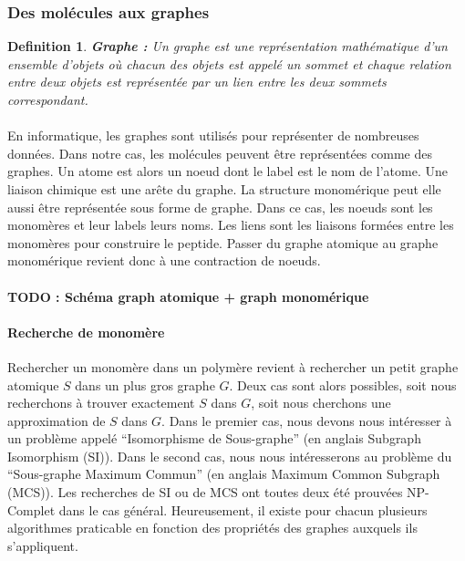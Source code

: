 \documentclass[12pt,french,twoside]{report}
\begin{document}
\subsubsection{Des molécules aux graphes}

\newtheorem{definition}{Definition}
\begin{definition}\textbf{Graphe :}
 Un graphe est une représentation mathématique d'un ensemble d'objets où chacun des objets est appelé un sommet et
 chaque relation entre deux objets est représentée par un lien entre les deux sommets correspondant.
\end{definition}

\paragraph{}En informatique, les graphes sont utilisés pour représenter de nombreuses données.
Dans notre cas, les molécules peuvent être représentées comme des graphes.
Un atome est alors un noeud dont le label est le nom de l'atome.
Une liaison chimique est une arête du graphe.
La structure monomérique peut elle aussi être représentée sous forme de graphe.
Dans ce cas, les noeuds sont les monomères et leur labels leurs noms.
Les liens sont les liaisons formées entre les monomères pour construire le peptide.
Passer du graphe atomique au graphe monomérique revient donc à une contraction de noeuds.

\paragraph{TODO : Schéma graph atomique + graph monomérique}



\paragraph{Recherche de monomère}Rechercher un monomère dans un polymère revient à rechercher un petit graphe atomique $S$ dans un plus gros graphe $G$.
Deux cas sont alors possibles, soit nous recherchons à trouver exactement $S$ dans $G$, soit nous cherchons une approximation de $S$ dans $G$.
Dans le premier cas, nous devons nous intéresser à un problème appelé ``Isomorphisme de Sous-graphe'' (en anglais Subgraph Isomorphism (SI)).
Dans le second cas, nous nous intéresserons au problème du ``Sous-graphe Maximum Commun'' (en anglais Maximum Common Subgraph (MCS)).
Les recherches de SI ou de MCS ont toutes deux été prouvées NP-Complet dans le cas général.
Heureusement, il existe pour chacun plusieurs algorithmes praticable en fonction des propriétés des graphes auxquels ils s'appliquent.
\end{document}
